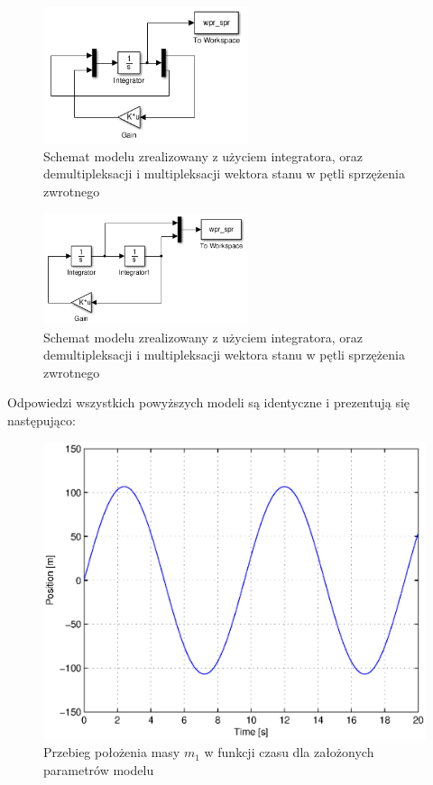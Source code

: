\documentclass[12pt]{article}
\begin{document}
\begin{figure}[!htb]
	\begin{center}
		\includegraphics[width=6cm]{../res/img/wpr_sprC_mdl.png}
	\end{center}
	\caption{Schemat modelu zrealizowany z użyciem integratora, oraz
	demultipleksacji i multipleksacji wektora stanu w pętli sprzężenia zwrotnego}
	\label{rys:sch_wpr_mdlC}
\end{figure}

\begin{figure}[!htb]
	\begin{center}
		\includegraphics[width=6cm]{../res/img/wpr_sprD_mdl.png}
	\end{center}
	\caption{Schemat modelu zrealizowany z użyciem integratora, oraz
	demultipleksacji i multipleksacji wektora stanu w pętli sprzężenia zwrotnego}
	\label{rys:sch_wpr_mdlD}
\end{figure}

\newpage

Odpowiedzi wszystkich powyższych modeli są identyczne i prezentują się
następująco:

\begin{figure}[!htb]
	\begin{center}
		\includegraphics[width=14cm]{../res/img/wpr_spr.eps}
	\end{center} 
	\caption{Przebieg położenia masy $m_1$ w funkcji czasu dla założonych
	parametrów modelu}
	\label{rys:wpr_spr}
\end{figure}
\end{document}

